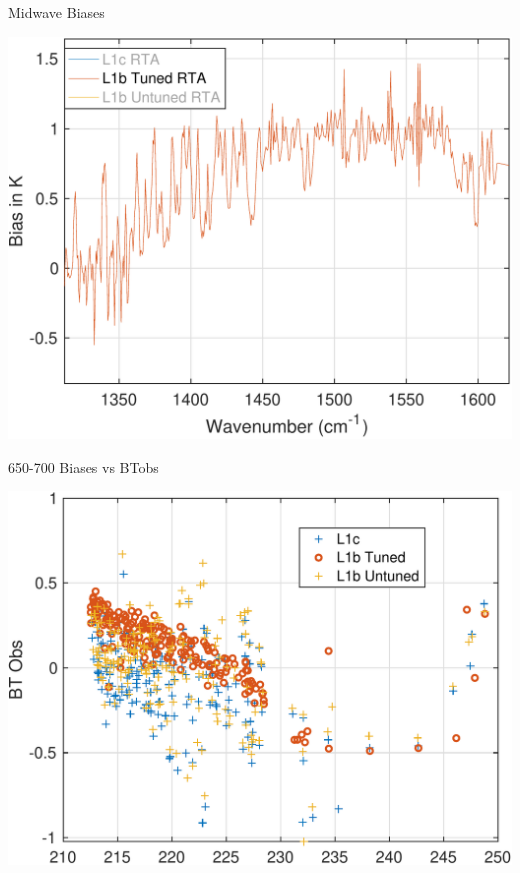 \documentclass[10pt,t]{beamer}
\begin{document}
\begin{frame}[label={sec:org22ce356}]{Midwave Biases}
\addtocounter{framenumber}{-1}
  \begin{center}
\includegraphics[width=0.75\linewidth]{./Talk2/bias_3rta_mw_justL1btuning.pdf}
\end{center}
\end{frame}

\begin{frame}[label={sec:org047c8ba}]{650-700 \wn Biases vs BTobs}
\begin{center}
\includegraphics[width=0.75\linewidth]{./Talk2/bias_vs_btobs_650-700.pdf}
\end{center}
\end{frame}
\end{document}
